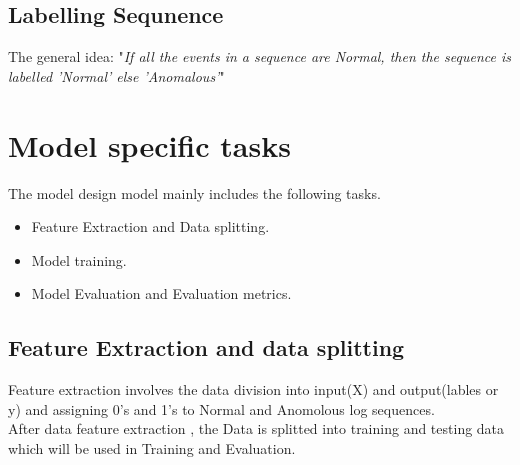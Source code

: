 \documentclass[titlepage]{article}
\begin{document}
\subsection{Labelling Sequnence}
The general idea: "\textit{If all the events in a  sequence are Normal, then the sequence is labelled 'Normal' else 'Anomalous'}" \\



\section{Model specific tasks}
The model design model mainly includes the following tasks.
\begin{itemize}
    \item Feature Extraction and Data splitting.
    \item Model training.
    \item Model Evaluation and Evaluation metrics.
\end{itemize}

\subsection{Feature Extraction and data splitting}
Feature extraction involves the data division into input(X) and output(lables or y) and assigning 0's and 1's to Normal and Anomolous log sequences.\\
After data feature extraction , the Data is splitted into training and testing data which will be used in Training and Evaluation.
\end{document}
